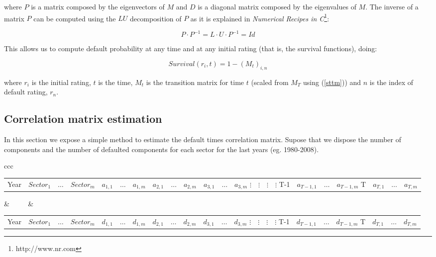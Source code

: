 \documentclass[a4paper,12pt,final]{article}
\begin{document}
where $P$ is a matrix composed by the eigenvectors of $M$ and $D$ is a diagonal 
matrix composed by the eigenvalues of $M$. The inverse of a matrix $P$ can be 
computed using the $LU$ decomposition of $P$ as it is explained in \emph{Numerical 
Recipes in C}\footnote{http://www.nr.com}:

\begin{displaymath}
P \cdot P^{-1} = L \cdot U \cdot P^{-1} = Id
\end{displaymath}

This allows us to compute default probability at any time and at any initial 
rating (that is, the survival functions), doing:

\begin{displaymath}
Survival(r_i, t) = 1 - \left( M_t \right)_{i, n}
\end{displaymath}

where $r_i$ is the initial rating, $t$ is the time, $M_t$ is the transition 
matrix for time $t$ (scaled from $M_T$ using (\ref{sttm})) and $n$ is the 
index of default rating, $r_n$.

\subsection{Correlation matrix estimation}
\label{ap:mcorrel}

In this section we expose a simple method to estimate the default times 
correlation matrix. Supose that we dispose the number of components and the 
number of defaulted components for each sector for the last years (eg. 
1980-2008). 

\begin{center}
\begin{tabular}[]{ccc}
\begin{tabular}[]{c|ccc}
Year     & $Sector_1$   & $\dots$  & $Sector_{m}$ \cr
{}        & $a_{1,1}$    & $\dots$  & $a_{1,m}$            & $a_{2,1}$    & $\dots$  & $a_{2,m}$            & $a_{3,1}$    & $\dots$  & $a_{3,m}$    \cr
$\vdots$ & $\vdots$     & $\vdots$ & $\vdots$     \cr
T-1      & $a_{T-1,1}$  & $\dots$  & $a_{T-1,m}$  \cr
T        & $a_{T,1}$    & $\dots$  & $a_{T,m}$    \cr
\end{tabular}
& $\qquad$ &
\begin{tabular}[]{c|ccc}
Year     & $Sector_1$   & $\dots$  & $Sector_{m}$ \cr
{}        & $d_{1,1}$    & $\dots$  & $d_{1,m}$            & $d_{2,1}$    & $\dots$  & $d_{2,m}$            & $d_{3,1}$    & $\dots$  & $d_{3,m}$    \cr
$\vdots$ & $\vdots$     & $\vdots$ & $\vdots$     \cr
T-1      & $d_{T-1,1}$  & $\dots$  & $d_{T-1,m}$  \cr
T        & $d_{T,1}$    & $\dots$  & $d_{T,m}$    \cr
\end{tabular}
\end{tabular}
\end{center}
\end{document}
